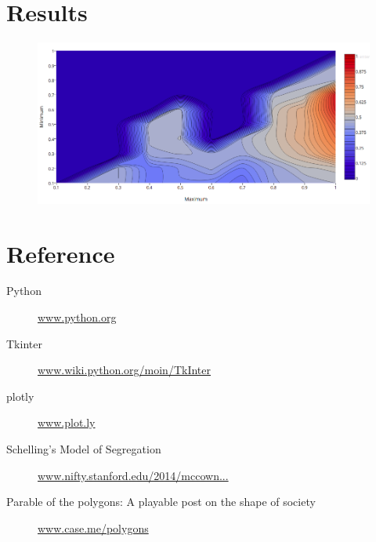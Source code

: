 \documentclass[a4paper,titlepage,11pt]{article}
\begin{document}
\newpage

\section{Results}

\begin{figure}[h]
    \centering
    \includegraphics[scale=0.70]{img/ploty.png}
\end{figure}

\newpage

\section{Reference}

\begin{description}
  \item[Python] \href{https://www.python.org}{www.python.org}
  \item[Tkinter] \href{https://wiki.python.org/moin/TkInter}{www.wiki.python.org/moin/TkInter}
  \item[plotly] \href{https://plot.ly/}{www.plot.ly}
  \item[Schelling's Model of Segregation] \href{http://nifty.stanford.edu/2014/mccown-schelling-model-segregation/}{www.nifty.stanford.edu/2014/mccown...}
  \item[Parable of the polygons: A playable post on the shape of society] \href{http://ncase.me/polygons/}{www.case.me/polygons}
\end{description}

\newpage
\end{document}
